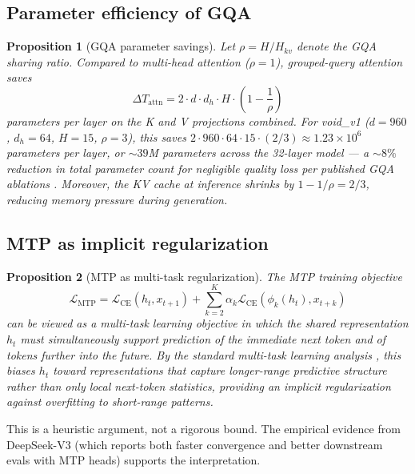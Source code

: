 \documentclass[11pt,a4paper]{article}
\newtheorem{proposition}{Proposition}
\theoremstyle{definition}
\theoremstyle{remark}
\begin{document}
\subsection{Parameter efficiency of GQA}

\begin{proposition}[GQA parameter savings]
Let $\rho = H / H_{kv}$ denote the GQA sharing ratio. Compared to
multi-head attention ($\rho = 1$), grouped-query attention saves
\begin{equation}
\Delta T_\text{attn}
   = 2 \cdot d \cdot d_h \cdot H \cdot \left(1 - \frac{1}{\rho}\right)
\end{equation}
parameters per layer on the K and V projections combined. For void\_v1
($d = 960$, $d_h = 64$, $H = 15$, $\rho = 3$), this saves
$2 \cdot 960 \cdot 64 \cdot 15 \cdot (2/3) \approx 1.23 \times 10^6$
parameters per layer, or $\sim 39$M parameters across the 32-layer
model --- a $\sim 8\%$ reduction in total parameter count for
negligible quality loss per published GQA ablations \citep{ainslie2023gqa}.
Moreover, the KV cache at inference shrinks by $1 - 1/\rho = 2/3$,
reducing memory pressure during generation.
\end{proposition}

\subsection{MTP as implicit regularization}

\begin{proposition}[MTP as multi-task regularization]
The MTP training objective
\begin{equation}
\mathcal{L}_\text{MTP}
   = \mathcal{L}_\text{CE}(h_t, x_{t+1})
   + \sum_{k=2}^{K} \alpha_k \mathcal{L}_\text{CE}(\phi_k(h_t), x_{t+k})
\end{equation}
can be viewed as a multi-task learning objective in which the shared
representation $h_t$ must simultaneously support prediction of the
immediate next token and of tokens further into the future. By the
standard multi-task learning analysis \citep{caruana1997multitask}, this
biases $h_t$ toward representations that capture longer-range
predictive structure rather than only local next-token statistics,
providing an implicit regularization against overfitting to short-range
patterns.
\end{proposition}

This is a heuristic argument, not a rigorous bound. The empirical
evidence from DeepSeek-V3 (which reports both faster convergence and
better downstream evals with MTP heads) supports the interpretation.
\end{document}
